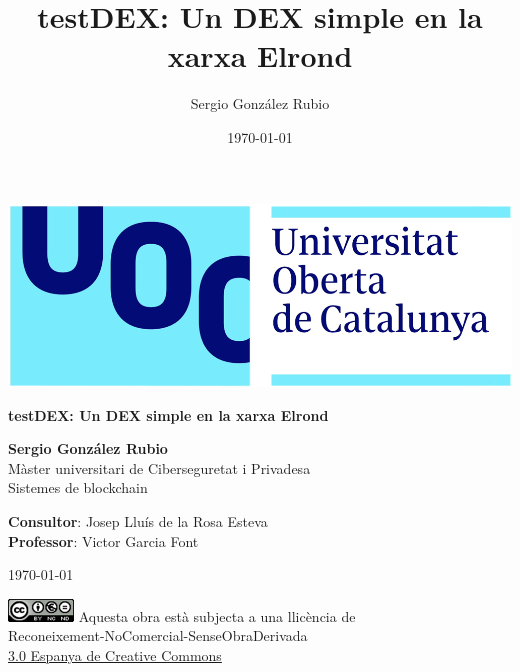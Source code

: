 \documentclass[11pt,a4paper]{article}
\author{Sergio González Rubio}
\title{testDEX: Un DEX simple en la xarxa Elrond}
\date{\today}
\begin{document}
\begin{titlepage}
\includegraphics[scale=0.2,right,valign=t]{uoc-logo.png}
\vspace*{\fill}
\begin{flushleft}
{\LARGE \textbf{testDEX: Un DEX simple en la xarxa Elrond}}
\end{flushleft}
\begin{flushleft}
\textbf{Sergio González Rubio}\\
Màster universitari de Ciberseguretat i Privadesa\\
Sistemes de blockchain
\end{flushleft}
\begin{flushleft}
\textbf{Consultor}: Josep Lluís de la Rosa Esteva\\
\textbf{Professor}: Victor Garcia Font
\end{flushleft}
\begin{flushleft}
\today
\end{flushleft}
\end{titlepage}


\begin{titlepage}
\vspace*{\fill}
\begin{flushleft}
\includegraphics[scale=1,left]{licencia-cc.png}
Aquesta obra està subjecta a una llicència de\\
Reconeixement-NoComercial-SenseObraDerivada\\
\href{http://creativecommons.org/licenses/by-nc-nd/3.0/es/}{3.0 Espanya de Creative Commons}
\end{flushleft}
\end{titlepage}
\end{document}
